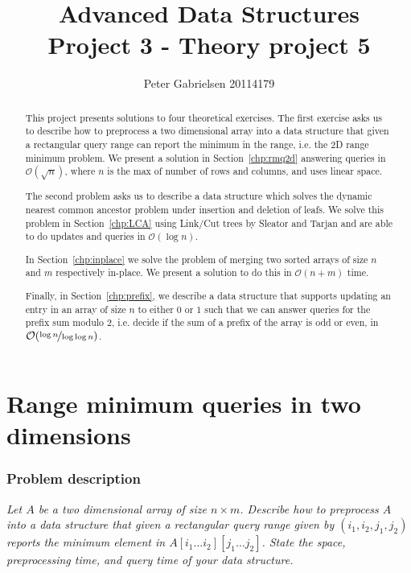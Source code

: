 \documentclass[a4paper,oneside,article,11pt]{memoir}
\title{Advanced Data Structures \\ Project 3 - Theory project 5}
\author{Peter Gabrielsen 20114179}
\begin{document}
\begin{titlingpage}
\clearpage

\maketitle
\thispagestyle{empty}

\begin{abstract}
This project presents solutions to four theoretical exercises. The first exercise asks us to describe how to preprocess a two dimensional array into a data structure that given a rectangular query range can report the minimum in the range, i.e. the 2D range minimum problem. We present a solution in Section~\ref{chp:rmq2d} answering queries in $\mathcal{O}(\sqrt{n})$, where $n$ is the max of number of rows and columns, and uses linear space.

The second problem asks us to describe a data structure which solves the dynamic nearest common ancestor problem under insertion and deletion of leafs. We solve this problem in Section~\ref{chp:LCA} using Link/Cut trees by Sleator and Tarjan\cite{Sleator1985} and are able to do updates and queries in $\mathcal{O}(\log n)$.

In Section~\ref{chp:inplace} we solve the problem of merging two sorted arrays of size $n$ and $m$ respectively in-place. We present a solution to do this in $\mathcal{O}(n+m)$ time.

Finally, in Section~\ref{chp:prefix}, we describe a data structure that supports updating an entry in an array of size $n$ to either $0$ or $1$ such that we can answer queries for the prefix sum modulo $2$, i.e. decide if the sum of a prefix of the array is odd or even, in $\mathcal{O}(\nicefrac{\log n}{\log\log n})$.
\end{abstract}
\end{titlingpage}

\pagebreak

\tableofcontents

\pagebreak

\chapter{Range minimum queries in two dimensions}
\label{chp:rmq2d}
\subsection{Problem description}
\textit{Let $A$ be a two dimensional array of size $n \times m$. Describe how to preprocess $A$ into a data structure that given a rectangular query range given by $(i_1,i_2,j_1,j_2)$ reports the minimum element in $A\left[i_1\dots i_2\right]\left[j_1\dots j_2\right]$. State the space, preprocessing time, and query time of your data structure.}
\end{document}
